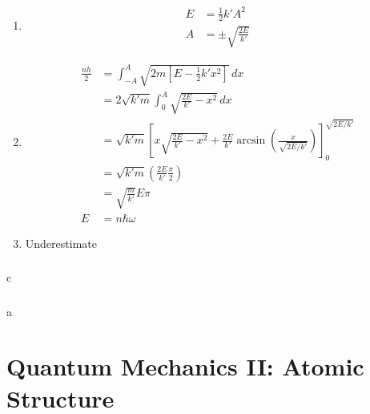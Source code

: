 \documentclass{article}
\begin{document}
\begin{enumerate}
  \item

        \begin{align*}
          E & = \frac{1}{2} k' A^2        \\
          A & = \pm \sqrt{\frac{2 E}{k'}}
        \end{align*}

  \item

        \begin{align*}
          \frac{n h}{2} & = \int_{-A}^A \sqrt{2 m [E - \frac{1}{2} k' x^2]} \,dx                                                                                           \\
                        & = 2 \sqrt{k' m} \int_0^A \sqrt{\frac{2 E}{k'} - x^2} \,dx                                                                                        \\
                        & = \sqrt{k' m} \left[ x \sqrt{\frac{2 E}{k'} - x^2} + \frac{2 E}{k'} \arcsin \left( \frac{x}{\sqrt{2 E / k'}} \right) \right]_0^{\sqrt{2 E / k'}} \\
                        & = \sqrt{k' m} \left( \frac{2 E}{k'} \frac{\pi}{2} \right)                                                                                        \\
                        & = \sqrt{\frac{m}{k'}} E \pi                                                                                                                      \\
          E             & = n \hbar \omega
        \end{align*}

  \item Underestimate
\end{enumerate}

\setcounter{subsubsection}{66}
\subsubsection{}

c

\setcounter{subsubsection}{68}
\subsubsection{}

a

\section{Quantum Mechanics II: Atomic Structure}
\end{document}
